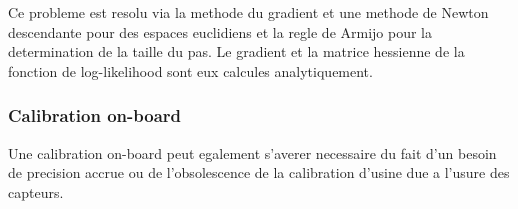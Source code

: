 	Ce probleme est resolu via la methode du gradient et une methode de Newton descendante pour des espaces euclidiens \cite{Newton} et la regle de Armijo pour la determination de la taille du pas. Le gradient et la matrice hessienne de la fonction de log-likelihood sont eux calcules analytiquement. 

\subsubsection{Calibration on-board}

	Une calibration on-board peut egalement s'averer necessaire du fait d'un besoin de precision accrue ou de l'obsolescence de la calibration d'usine due a l'usure des capteurs.
